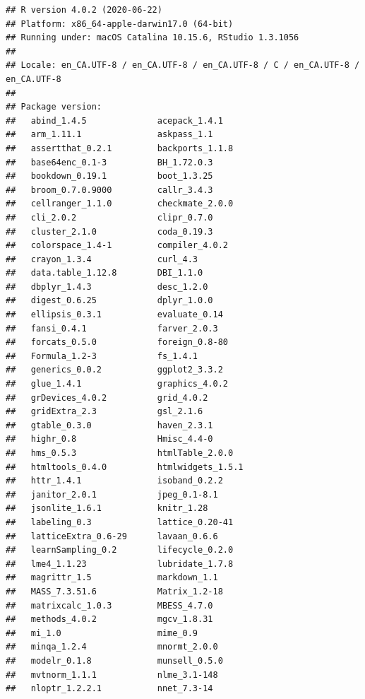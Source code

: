 \documentclass[
]{krantz}
\begin{document}
\begin{verbatim}
## R version 4.0.2 (2020-06-22)
## Platform: x86_64-apple-darwin17.0 (64-bit)
## Running under: macOS Catalina 10.15.6, RStudio 1.3.1056
## 
## Locale: en_CA.UTF-8 / en_CA.UTF-8 / en_CA.UTF-8 / C / en_CA.UTF-8 / en_CA.UTF-8
## 
## Package version:
##   abind_1.4.5              acepack_1.4.1           
##   arm_1.11.1               askpass_1.1             
##   assertthat_0.2.1         backports_1.1.8         
##   base64enc_0.1-3          BH_1.72.0.3             
##   bookdown_0.19.1          boot_1.3.25             
##   broom_0.7.0.9000         callr_3.4.3             
##   cellranger_1.1.0         checkmate_2.0.0         
##   cli_2.0.2                clipr_0.7.0             
##   cluster_2.1.0            coda_0.19.3             
##   colorspace_1.4-1         compiler_4.0.2          
##   crayon_1.3.4             curl_4.3                
##   data.table_1.12.8        DBI_1.1.0               
##   dbplyr_1.4.3             desc_1.2.0              
##   digest_0.6.25            dplyr_1.0.0             
##   ellipsis_0.3.1           evaluate_0.14           
##   fansi_0.4.1              farver_2.0.3            
##   forcats_0.5.0            foreign_0.8-80          
##   Formula_1.2-3            fs_1.4.1                
##   generics_0.0.2           ggplot2_3.3.2           
##   glue_1.4.1               graphics_4.0.2          
##   grDevices_4.0.2          grid_4.0.2              
##   gridExtra_2.3            gsl_2.1.6               
##   gtable_0.3.0             haven_2.3.1             
##   highr_0.8                Hmisc_4.4-0             
##   hms_0.5.3                htmlTable_2.0.0         
##   htmltools_0.4.0          htmlwidgets_1.5.1       
##   httr_1.4.1               isoband_0.2.2           
##   janitor_2.0.1            jpeg_0.1-8.1            
##   jsonlite_1.6.1           knitr_1.28              
##   labeling_0.3             lattice_0.20-41         
##   latticeExtra_0.6-29      lavaan_0.6.6            
##   learnSampling_0.2        lifecycle_0.2.0         
##   lme4_1.1.23              lubridate_1.7.8         
##   magrittr_1.5             markdown_1.1            
##   MASS_7.3.51.6            Matrix_1.2-18           
##   matrixcalc_1.0.3         MBESS_4.7.0             
##   methods_4.0.2            mgcv_1.8.31             
##   mi_1.0                   mime_0.9                
##   minqa_1.2.4              mnormt_2.0.0            
##   modelr_0.1.8             munsell_0.5.0           
##   mvtnorm_1.1.1            nlme_3.1-148            
##   nloptr_1.2.2.1           nnet_7.3-14             

\end{verbatim}
\end{document}
